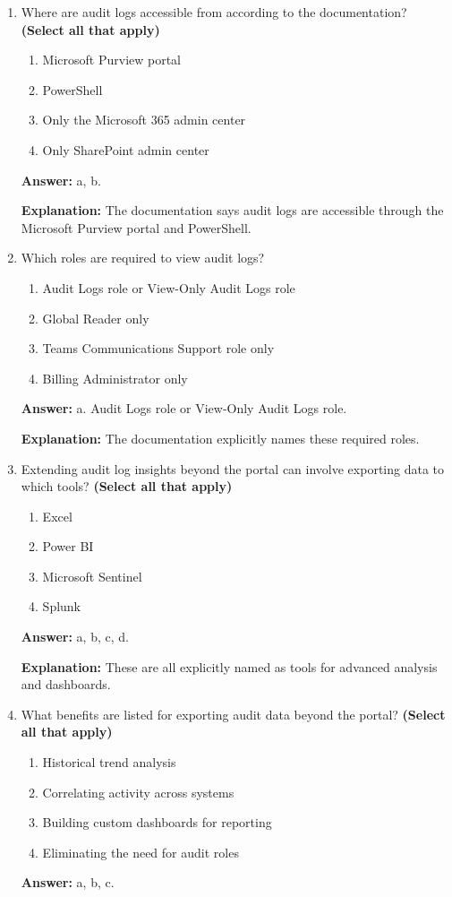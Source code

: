 \documentclass[10pt]{article}
\begin{document}
\begin{enumerate}[leftmargin=*]
\item Where are audit logs accessible from according to the documentation? \textbf{(Select all that apply)}
\begin{enumerate}[label=\alph*., leftmargin=1.5em]
\item Microsoft Purview portal
\item PowerShell
\item Only the Microsoft 365 admin center
\item Only SharePoint admin center
\end{enumerate}
\textbf{Answer:} a, b.

\textbf{Explanation:} The documentation says audit logs are accessible through the Microsoft Purview portal and PowerShell.

\item Which roles are required to view audit logs?
\begin{enumerate}[label=\alph*., leftmargin=1.5em]
\item Audit Logs role or View-Only Audit Logs role
\item Global Reader only
\item Teams Communications Support role only
\item Billing Administrator only
\end{enumerate}
\textbf{Answer:} a. Audit Logs role or View-Only Audit Logs role.

\textbf{Explanation:} The documentation explicitly names these required roles.

\item Extending audit log insights beyond the portal can involve exporting data to which tools? \textbf{(Select all that apply)}
\begin{enumerate}[label=\alph*., leftmargin=1.5em]
\item Excel
\item Power BI
\item Microsoft Sentinel
\item Splunk
\end{enumerate}
\textbf{Answer:} a, b, c, d.

\textbf{Explanation:} These are all explicitly named as tools for advanced analysis and dashboards.

\item What benefits are listed for exporting audit data beyond the portal? \textbf{(Select all that apply)}
\begin{enumerate}[label=\alph*., leftmargin=1.5em]
\item Historical trend analysis
\item Correlating activity across systems
\item Building custom dashboards for reporting
\item Eliminating the need for audit roles
\end{enumerate}
\textbf{Answer:} a, b, c.


\end{enumerate}
\end{document}

